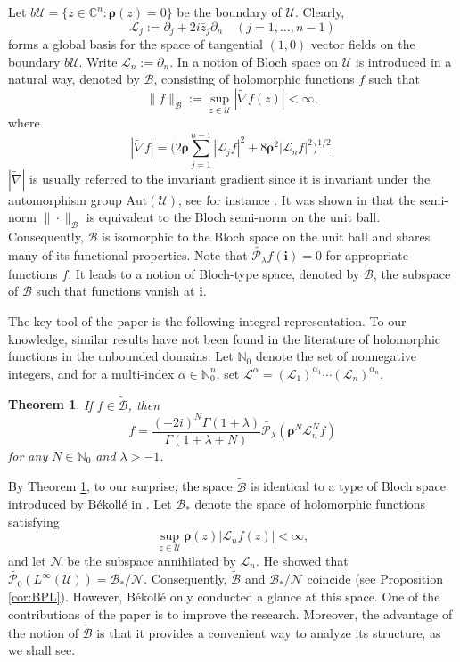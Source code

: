 \documentclass{amsart}
\newtheorem{theorem}{Theorem}[section]
\numberwithin{equation}{section}
\newcommand{\bfL}{\mathcal{L}}
\newcommand{\calU}{\mathcal{U}}
\newcommand{\bfi}{\mathbf{i}}
\newcommand{\bfrho}{\boldsymbol{\rho}}
\newcommand{\calB}{\mathcal{B}}
\newcommand{\bbN}{\mathbb{N}}
\begin{document}
Let $b\calU=\{z\in \mathbb{C}^n: \bfrho(z)=0\}$ be the boundary of $\calU$. Clearly,
\[
\bfL_j := \partial_j+ 2i\bar{z}_j \partial_n\quad (j=1,\ldots, n-1)
\]
forms a global basis for the space of tangential $(1, 0)$ vector fields on the boundary $b\calU$.
Write $\bfL_n := \partial_n$.
In \cite{Si22BMO} a notion of Bloch space on $\calU$ is introduced in a natural way, denoted by $\calB$,  consisting of holomorphic functions $f$ such that
\[
\| f \|_{\calB}:=\sup_{z\in\calU} |\widetilde{\nabla}f(z)| <\infty,
\]
where
\begin{equation*}\label{eqn:inv.gra.f}
|\widetilde{\nabla} f| = \Bigg(2\bfrho \sum_{j=1}^{n-1} |\bfL_j f|^2 + 8\bfrho^2 |\bfL_n f|^2\Bigg)^{1/2}.
\end{equation*} 
$|\widetilde{\nabla}|$ is usually referred to the invariant gradient since it is invariant under the  automorphism group $\text{Aut}(\calU)$;  see for instance \cite[Chapter 3]{Sto199}.
It was shown in \cite{Si22BMO} that the semi-norm $\|\cdot\|_{\calB}$ is equivalent to the Bloch semi-norm on the unit ball. Consequently, $\calB$ is isomorphic to the Bloch space on the unit ball and shares many of its functional properties.
Note that $\widetilde{\mathcal{P}_{\lambda}}f(\bfi)=0 $ for appropriate functions $f$.
It leads to a notion of Bloch-type space, denoted by $\widetilde{\calB}$, the subspace of $\calB$ such that functions vanish at $\bfi$. 

The key tool of the paper is the following integral representation. 
To our knowledge, similar results have not been found in the literature of holomorphic functions in the unbounded domains. 
Let $\mathbb{N}_0$ denote the set of nonnegative integers, 
and for a multi-index $\alpha\in \mathbb{N}_0^n$, set $\bfL^{\alpha}=(\bfL_1)^{\alpha_1} \cdots (\bfL_n)^{\alpha_n}$.



\begin{theorem}\label{thm:reproducingfml}
If $f\in \widetilde{\calB}$, then
\begin{equation*}\label{eqn:reproducingfml}
f= \frac{(-2i)^N\Gamma(1+\lambda)}{\Gamma(1+\lambda+N)} \widetilde{\mathcal{P}_{\lambda}} (\bfrho^N \bfL_n^N f)
\end{equation*}
for any $N\in\bbN_0$ and $\lambda>-1$.
\end{theorem}

By Theorem \ref{thm:reproducingfml}, to our surprise, the space $\widetilde{\calB}$ is identical to a type of Bloch space introduced by B\'ekoll\'e in \cite{Bek83}.
Let $\calB_*$ denote the space of holomorphic functions satisfying 
\[
\sup_{z\in\calU} \bfrho(z) |\bfL_n f(z)| <\infty,
\]
and let $\mathcal{N}$ be the subspace annihilated by $\bfL_n$.
He showed that $\widetilde{\mathcal{P}_{0}}(L^{\infty}(\calU))=\calB_*/\mathcal{N}$.
Consequently, $\widetilde{\calB}$ and $\calB_*/\mathcal{N}$ coincide (see Proposition \ref{cor:BPL}). 
However, B\'ekoll\'e only conducted a glance at this space.
One of the contributions of the paper is to improve the research.
Moreover, the advantage of the notion of $\widetilde{\calB}$ is that it provides a convenient way to analyze its structure, as we shall see.
\end{document}
